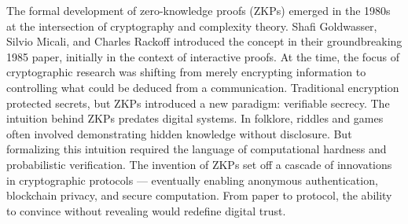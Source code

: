 
\begin{historical}
The formal development of zero-knowledge proofs (ZKPs) emerged in the 1980s at the intersection of cryptography and complexity theory. Shafi Goldwasser, Silvio Micali, and Charles Rackoff introduced the concept in their groundbreaking 1985 paper, initially in the context of interactive proofs. At the time, the focus of cryptographic research was shifting from merely encrypting information to controlling what could be deduced from a communication. Traditional encryption protected secrets, but ZKPs introduced a new paradigm: verifiable secrecy.
The intuition behind ZKPs predates digital systems. In folklore, riddles and games often involved demonstrating hidden knowledge without disclosure. But formalizing this intuition required the language of computational hardness and probabilistic verification. The invention of ZKPs set off a cascade of innovations in cryptographic protocols — eventually enabling anonymous authentication, blockchain privacy, and secure computation. From paper to protocol, the ability to convince without revealing would redefine digital trust.
\end{historical}